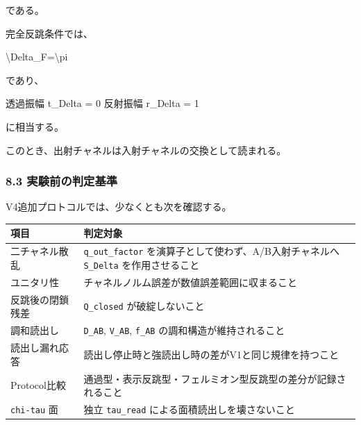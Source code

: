 \documentclass[
]{article}
\newenvironment{Shaded}{}{}
\newcommand{\NormalTok}[1]{#1}
\newcounter{none} %
\begin{document}
である。

完全反跳条件では、

\begin{Shaded}
\begin{Highlighting}[]
\NormalTok{\textbackslash{}Delta\_F=\textbackslash{}pi}
\end{Highlighting}
\end{Shaded}

であり、

\begin{Shaded}
\begin{Highlighting}[]
\NormalTok{透過振幅 t\_Delta = 0}
\NormalTok{反射振幅 r\_Delta = 1}
\end{Highlighting}
\end{Shaded}

に相当する。

このとき、出射チャネルは入射チャネルの交換として読まれる。

\subsubsection{8.3
実験前の判定基準}\label{ux5b9fux9a13ux524dux306eux5224ux5b9aux57faux6e96}

V4追加プロトコルでは、少なくとも次を確認する。

{\def\LTcaptype{none} %
\begin{longtable}[]{@{}
  >{\raggedright\arraybackslash}p{}
  >{\raggedright\arraybackslash}p{}@{}}
\toprule\noalign{}
\begin{minipage}[b]{\linewidth}\raggedright
項目
\end{minipage} & \begin{minipage}[b]{\linewidth}\raggedright
判定対象
\end{minipage} \\
\midrule\noalign{}
\endhead
\bottomrule\noalign{}
\endlastfoot
二チャネル散乱 & \texttt{q\_out\_factor}
を演算子として使わず、A/B入射チャネルへ \texttt{S\_Delta}
を作用させること \\
ユニタリ性 & チャネルノルム誤差が数値誤差範囲に収まること \\
反跳後の閉鎖残差 & \texttt{Q\_closed} が破綻しないこと \\
調和読出し & \texttt{D\_AB}, \texttt{V\_AB}, \texttt{f\_AB}
の調和構造が維持されること \\
読出し漏れ応答 & 読出し停止時と強読出し時の差がV1と同じ規律を持つこと \\
Protocol比較 &
通過型・表示反跳型・フェルミオン型反跳型の差分が記録されること \\
\texttt{chi-tau} 面 & 独立 \texttt{tau\_read}
による面積読出しを壊さないこと \\
\end{longtable}
}
\end{document}
